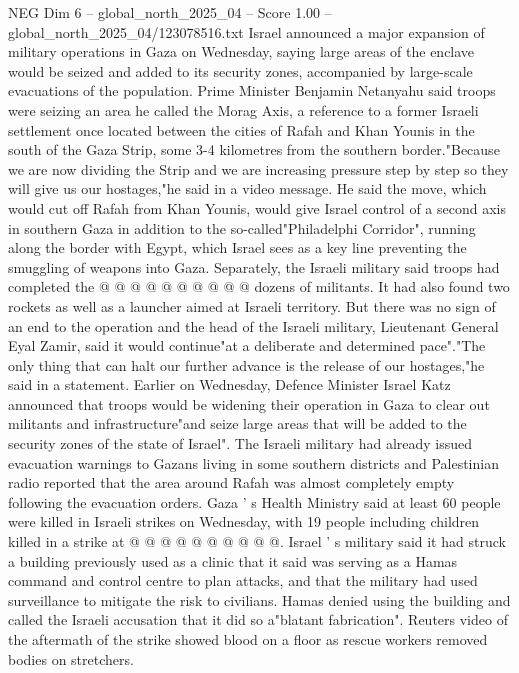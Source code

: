 \begin{textsample}{NEG Dim 6 – global\_north\_2025\_04 – Score 1.00 – global\_north\_2025\_04/123078516.txt}  \label{ex:f6_neg_239}
Israel announced a major expansion of military operations in Gaza on Wednesday, saying large areas of the enclave would be seized and added to its security zones, accompanied by large-scale evacuations of the population.
Prime Minister Benjamin Netanyahu said troops were seizing an area he called the Morag Axis, a reference to a former Israeli settlement once located between the cities of Rafah and Khan Younis in the south of the Gaza Strip, some 3-4 kilometres from the southern border."Because we are now dividing the Strip and we are increasing pressure step by step so they will give us our hostages,"he said in a video message.
He said the move, which would cut off Rafah from Khan Younis, would give Israel control of a second axis in southern Gaza in addition to the so-called"Philadelphi Corridor", running along the border with Egypt, which Israel sees as a key line preventing the smuggling of weapons into Gaza.
Separately, the Israeli military said troops had completed the @ @ @ @ @ @ @ @ @ @ dozens of militants.
It had also found two rockets as well as a launcher aimed at Israeli territory.
But there was no sign of an end to the operation and the head of the Israeli military, Lieutenant General Eyal Zamir, said it would continue"at a deliberate and determined pace"."The only thing that can halt our further advance is the release of our hostages,"he said in a statement.
Earlier on Wednesday, Defence Minister Israel Katz announced that troops would be widening their operation in Gaza to clear out militants and infrastructure"and seize large areas that will be added to the security zones of the state of Israel".
The Israeli military had already issued evacuation warnings to Gazans living in some southern districts and Palestinian radio reported that the area around Rafah was almost completely empty following the evacuation orders.
Gaza ' s Health Ministry said at least 60 people were killed in Israeli strikes on Wednesday, with 19 people including children killed in a strike at @ @ @ @ @ @ @ @ @ @.
Israel ' s military said it had struck a building previously used as a clinic that it said was serving as a Hamas command and control centre to plan attacks, and that the military had used surveillance to mitigate the risk to civilians.
Hamas denied using the building and called the Israeli accusation that it did so a"blatant fabrication".
Reuters video of the aftermath of the strike showed blood on a floor as rescue workers removed bodies on stretchers.

\end{textsample}
